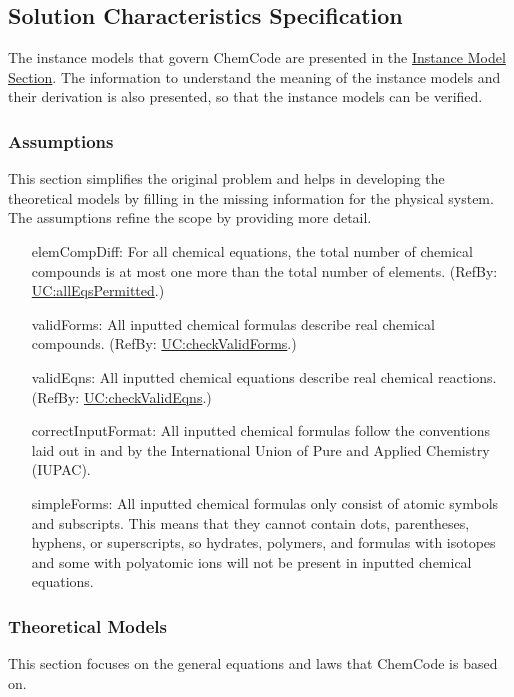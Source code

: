 \documentclass[12pt]{article}
\begin{document}
\subsection{Solution Characteristics Specification}
\label{Sec:SolCharSpec}
The instance models that govern ChemCode are presented in the \hyperref[Sec:IMs]{Instance Model Section}. The information to understand the meaning of the instance models and their derivation is also presented, so that the instance models can be verified.

\subsubsection{Assumptions}
\label{Sec:Assumps}
This section simplifies the original problem and helps in developing the theoretical models by filling in the missing information for the physical system. The assumptions refine the scope by providing more detail.

\begin{itemize}
\item[elemCompDiff:\phantomsection\label{elemCompDiff}]{For all chemical equations, the total number of chemical compounds is at most one more than the total number of elements. (RefBy: \hyperref[allEqsPermitted]{UC:allEqsPermitted}.)}
\item[validForms:\phantomsection\label{validForms}]{All inputted chemical formulas describe real chemical compounds. (RefBy: \hyperref[checkValidForms]{UC:checkValidForms}.)}
\item[validEqns:\phantomsection\label{validEqns}]{All inputted chemical equations describe real chemical reactions. (RefBy: \hyperref[checkValidEqns]{UC:checkValidEqns}.)}
\item[correctInputFormat:\phantomsection\label{correctInputFormat}]{All inputted chemical formulas follow the conventions laid out in \cite{inorganicIUPAC} and \cite{organicIUPAC} by the International Union of Pure and Applied Chemistry (IUPAC).}
\item[simpleForms:\phantomsection\label{simpleForms}]{All inputted chemical formulas only consist of atomic symbols and subscripts. This means that they cannot contain dots, parentheses, hyphens, or superscripts, so hydrates, polymers, and formulas with isotopes and some with polyatomic ions will not be present in inputted chemical equations.}
\end{itemize}
\subsubsection{Theoretical Models}
\label{Sec:TMs}
This section focuses on the general equations and laws that ChemCode is based on.
\end{document}
